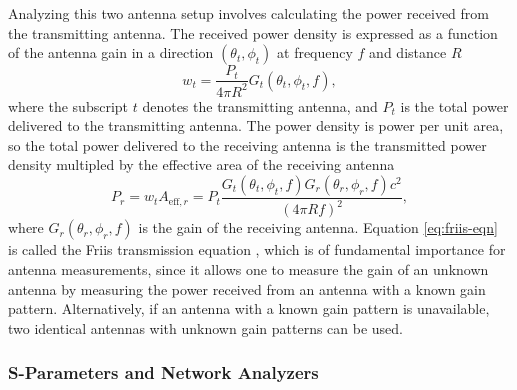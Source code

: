 Analyzing this two antenna setup involves calculating the power received from the transmitting antenna. The received power density is expressed as a function of the antenna gain in a direction  $(\theta_t,\phi_t)$ at frequency $f$ and distance $R$
\begin{equation}
    w_t = \frac{P_t}{4\pi R^2}G_t(\theta_t,\phi_t,f),
\end{equation}
where the subscript $t$ denotes the transmitting antenna, and $P_t$ is the total power delivered to the transmitting antenna. The power density is power per unit area, so the total power delivered to the receiving antenna is the transmitted power density multipled by the effective area of the receiving antenna
\begin{equation}
    P_r = w_tA_{\textrm{eff},r}=P_t\frac{G_t(\theta_t,\phi_t,f)G_r(\theta_r,\phi_r,f)c^2}{(4\pi Rf)^2},
    \label{eq:friis-eqn}
\end{equation}
where $G_r(\theta_r,\phi_r,f)$ is the gain of the receiving antenna. Equation \ref{eq:friis-eqn} is called the Friis transmission equation \cite{friis_paper}, which is of fundamental importance for antenna measurements, since it allows one to measure the gain of an unknown antenna by measuring the power received from an antenna with a known gain pattern. Alternatively, if an antenna with a known gain pattern is unavailable, two identical antennas with unknown gain patterns can be used.

\subsubsection{S-Parameters and Network Analyzers}

